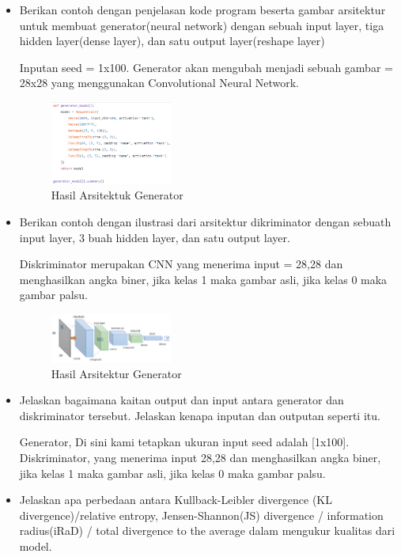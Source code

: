 \begin{enumerate}
\begin{itemize}
        \item Berikan contoh dengan penjelasan kode program beserta gambar arsitektur untuk membuat generator(neural network) dengan sebuah input layer, tiga hidden layer(dense layer), dan satu output layer(reshape layer)

Inputan seed = 1x100. Generator akan mengubah menjadi sebuah gambar = 28x28  yang menggunakan Convolutional Neural Network.

	\begin{figure}[H]
		\includegraphics[width=4cm]{figures/1174008/8/teori9.PNG}
            	\centering
           	 \caption{Hasil Arsitektuk Generator}
       	 \end{figure}

        \item Berikan contoh dengan ilustrasi dari arsitektur dikriminator dengan sebuath input layer, 3 buah hidden layer, dan satu output layer.

Diskriminator merupakan CNN yang menerima input = 28,28 dan menghasilkan angka biner, jika kelas 1 maka gambar asli, jika kelas 0 maka gambar palsu.

	\begin{figure}[H]
		\includegraphics[width=4cm]{figures/1174008/8/teori10.PNG}
            	\centering
           	 \caption{Hasil Arsitektur Generator}
       	 \end{figure}

        \item Jelaskan bagaimana kaitan output dan input antara generator dan diskriminator tersebut. Jelaskan kenapa inputan dan outputan seperti itu.

Generator, Di sini kami tetapkan ukuran input seed adalah [1x100]. Diskriminator, yang menerima input 28,28 dan menghasilkan angka biner, jika kelas 1 maka gambar asli, jika kelas 0 maka gambar palsu.

        \item Jelaskan apa perbedaan antara Kullback-Leibler divergence (KL divergence)/relative entropy, Jensen-Shannon(JS) divergence / information radius(iRaD) / total divergence to the average dalam mengukur kualitas dari model.


\end{itemize}
\end{enumerate}

